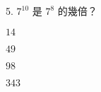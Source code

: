 \documentclass[12pt]{article}
\begin{document}
\begin{problem}
  \item[5.] $7^{10}$ 是 $7^8$ 的幾倍？
  \begin{choices}
    \item $14$
    \item $49$
    \item $98$
    \item $343$
  \end{choices}
\end{problem}
\end{document}
